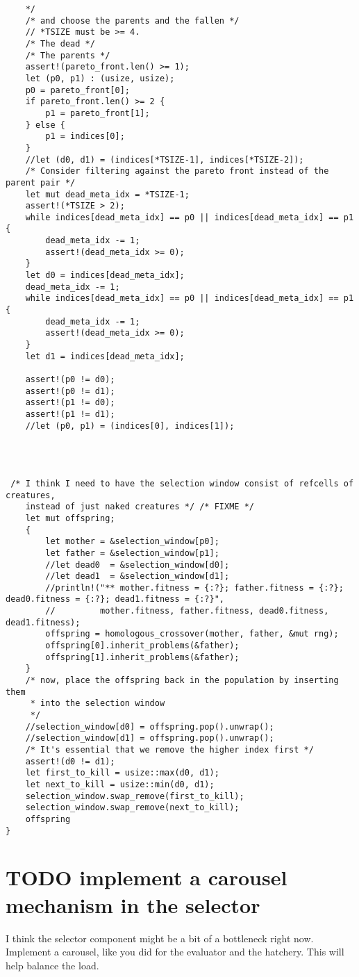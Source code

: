 \documentclass[11pt]{article}
\begin{document}
\begin{lstlisting}
    */
    /* and choose the parents and the fallen */
    // *TSIZE must be >= 4.
    /* The dead */
    /* The parents */
    assert!(pareto_front.len() >= 1);
    let (p0, p1) : (usize, usize);
    p0 = pareto_front[0];
    if pareto_front.len() >= 2 {
        p1 = pareto_front[1];
    } else {
        p1 = indices[0];
    }
    //let (d0, d1) = (indices[*TSIZE-1], indices[*TSIZE-2]);
    /* Consider filtering against the pareto front instead of the parent pair */
    let mut dead_meta_idx = *TSIZE-1;
    assert!(*TSIZE > 2);
    while indices[dead_meta_idx] == p0 || indices[dead_meta_idx] == p1 {
        dead_meta_idx -= 1;
        assert!(dead_meta_idx >= 0);
    }
    let d0 = indices[dead_meta_idx];
    dead_meta_idx -= 1;
    while indices[dead_meta_idx] == p0 || indices[dead_meta_idx] == p1 {
        dead_meta_idx -= 1;
        assert!(dead_meta_idx >= 0);
    }
    let d1 = indices[dead_meta_idx];

    assert!(p0 != d0);
    assert!(p0 != d1);
    assert!(p1 != d0);
    assert!(p1 != d1);
    //let (p0, p1) = (indices[0], indices[1]);




 /* I think I need to have the selection window consist of refcells of creatures, 
    instead of just naked creatures */ /* FIXME */ 
    let mut offspring;
    {
        let mother = &selection_window[p0];
        let father = &selection_window[p1];
        //let dead0  = &selection_window[d0];
        //let dead1  = &selection_window[d1];
        //println!("** mother.fitness = {:?}; father.fitness = {:?}; dead0.fitness = {:?}; dead1.fitness = {:?}",
        //         mother.fitness, father.fitness, dead0.fitness, dead1.fitness);
        offspring = homologous_crossover(mother, father, &mut rng);
        offspring[0].inherit_problems(&father);
        offspring[1].inherit_problems(&father);
    }
    /* now, place the offspring back in the population by inserting them
     * into the selection window
     */
    //selection_window[d0] = offspring.pop().unwrap();
    //selection_window[d1] = offspring.pop().unwrap();
    /* It's essential that we remove the higher index first */
    assert!(d0 != d1);
    let first_to_kill = usize::max(d0, d1);
    let next_to_kill = usize::min(d0, d1);
    selection_window.swap_remove(first_to_kill);
    selection_window.swap_remove(next_to_kill);
    offspring
}
\end{lstlisting}

\section{{\bfseries\sffamily TODO} implement a carousel mechanism in the selector}
\label{sec:org719baf6}

I think the selector component might be a bit of a bottleneck right now. 
Implement a carousel, like you did for the evaluator and the hatchery. 
This will help balance the load. 
\end{document}
